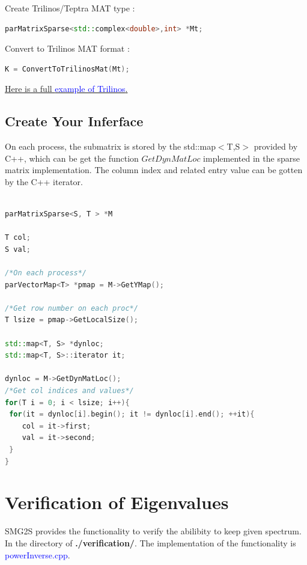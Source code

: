 \documentclass[a4paper, 10 pt]{report}
\begin{document}
	Create Trilinos/Teptra MAT type :
	\begin{lstlisting}[language=C++,frame=single]
   parMatrixSparse<std::complex<double>,int> *Mt;
	\end{lstlisting}

	Convert to Trilinos MAT format :
	\begin{lstlisting}[language=C++,frame=single]
   K = ConvertToTrilinosMat(Mt); 
	\end{lstlisting}

	\href{https://github.com/SMG2S/SMG2S/tree/master/example/teptra}{Here is a full \textcolor{blue}{ example of Trilinos}.}
	
	\section{Create Your Inferface}
	
	On each process, the submatrix is stored by the std::map$<$T,S$>$ provided by C++, which can be get the function $GetDynMatLoc$ implemented in the sparse matrix implementation. The column index and related entry value can be gotten by the C++ iterator.
	
	\begin{lstlisting}[language=C++,frame=single]
	
parMatrixSparse<S, T > *M
	
T col;
S val;
	
/*On each process*/
parVectorMap<T> *pmap = M->GetYMap();
   
/*Get row number on each proc*/
T lsize = pmap->GetLocalSize(); 
   
std::map<T, S> *dynloc;
std::map<T, S>::iterator it;
   
dynloc = M->GetDynMatLoc();
/*Get col indices and values*/
for(T i = 0; i < lsize; i++){
 for(it = dynloc[i].begin(); it != dynloc[i].end(); ++it){
   	col = it->first;
   	val = it->second;
 }
}
	\end{lstlisting}
	\newpage

	\chapter{Verification of Eigenvalues}
	
	SMG2S provides the functionality to verify the abilibity to keep given spectrum. In the directory of \textbf{./verification/}. The implementation of the functionality is \textcolor{blue}{powerInverse.cpp}.
	
\end{document}
